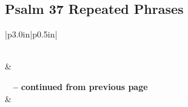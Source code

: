 \subsection{Psalm 37 Repeated Phrases}


\normalsize
 
\begin{center}
\begin{longtable}{|p{3.0in}|p{0.5in}|}
\caption[Psalm 37 Repeated Phrases]{Psalm 37 Repeated Phrases}\label{table:Repeated Phrases Psalm 37} \\
\hline {} &  \\ \hline 
\endfirsthead
 
{{\bfseries \tablename\ \thetable{} -- continued from previous page}} \\  
\hline {} &  \\ \hline 
\endhead
 

\end{longtable}
\end{center}
